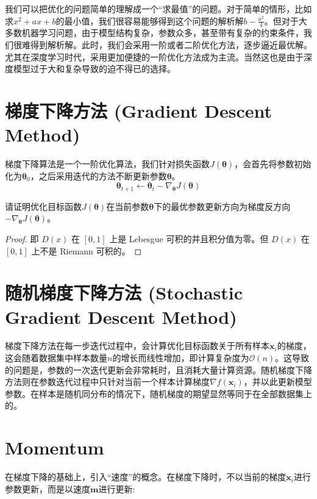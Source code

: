 \documentclass[lang=cn,newtx,10pt,scheme=chinese,color=black]{elegantbook}
\begin{document}
我们可以把优化的问题简单的理解成一个“求最值”的问题。对于简单的情形，比如求$x^2+ax+b$的最小值，我们很容易能够得到这个问题的解析解$b-\frac{a^2}{4}$。但对于大多数机器学习问题，由于模型结构复杂，参数众多，甚至带有复杂的约束条件，我们很难得到解析解。此时，我们会采用一阶或者二阶优化方法，逐步逼近最优解。尤其在深度学习时代，采用更加便捷的一阶优化方法成为主流。当然这也是由于深度模型过于大和复杂导致的迫不得已的选择。

\section{梯度下降方法 (Gradient Descent Method)}

梯度下降算法是一个一阶优化算法，我们针对损失函数$J(\bm\theta)$，会首先将参数初始化为$\bm\theta_{0}$，之后采用迭代的方法不断更新参数$\bm\theta$。
\begin{equation}
  \label{grad_descent}
  \bm\theta_{t+1} \leftarrow \bm\theta_{t} - \nabla_{\bm\theta}J(\bm\theta)
\end{equation}

\begin{exercise}\label{exer:sgd}
  请证明优化目标函数$J(\bm{\theta})$在当前参数$\bm{\theta}$下的最优参数更新方向为梯度反方向$-\nabla_{\bm\theta}J(\bm\theta)$。  
\end{exercise}
 
\begin{proof}
  即 $D(x)$ 在 $[0,1]$ 上是 Lebesgue 可积的并且积分值为零。但 $D(x)$ 在 $[0,1]$ 上不是 Riemann 可积的。
\end{proof}

\section{随机梯度下降方法 (Stochastic Gradient Descent Method)}
梯度下降方法在每一步迭代过程中，会计算优化目标函数关于所有样本${\bm{x}_{i}}$的梯度，这会随着数据集中样本数量$n$的增长而线性增加，即计算复杂度为$\mathcal{O}(n)$。这导致的问题是，参数的一次迭代更新会非常耗时，且消耗大量计算资源。随机梯度下降方法则在参数迭代过程中只针对当前一个样本计算梯度$\nabla f(\bm{x}_i)$，并以此更新模型参数。在样本是随机同分布的情况下，随机梯度的期望显然等同于在全部数据集上的。

\section{Momentum}
在梯度下降的基础上，引入“速度”的概念。在梯度下降时，不以当前的梯度${\bm{x}_{i}}$进行参数更新，而是以速度${\bm{m}}$进行更新:
\end{document}
